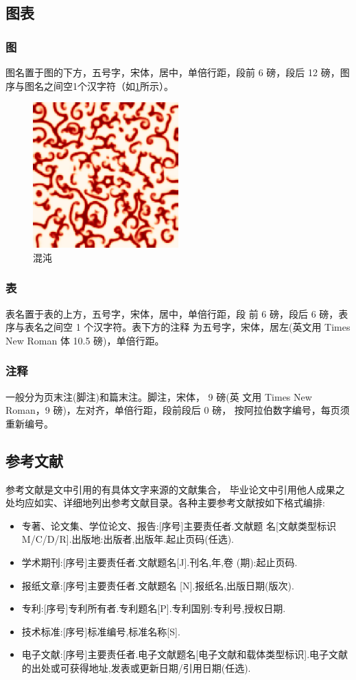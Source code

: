\documentclass{LZU}
\begin{document}
\subsection{图表}
\subsubsection{图}
\label{ssub:figure}
图名置于图的下方，五号字，宋体，居中，单倍行距，段前 6 磅，段后 12 磅，图序与图名之间空1个汉字符（如\cref{fig:chaos}所示）。
\begin{figure}
    \centering
    \includegraphics[width=0.5\textwidth]{pic/chaos.png}
    \caption{混沌}
    \label{fig:chaos}
\end{figure}

\subsubsection{表}
表名置于表的上方，五号字，宋体，居中，单倍行距，段 前 6 磅，段后 6 磅，表序与表名之间空 1 个汉字符。表下方的注释 为五号字，宋体，居左(英文用 Times New Roman 体 10.5 磅)，单倍行距。
\subsubsection{注释}
一般分为页末注(脚注)和篇末注。脚注，宋体， 9 磅(英 文用 Times New Roman，9 磅)，左对齐，单倍行距，段前段后 0 磅， 按阿拉伯数字编号，每页须重新编号。
\subsection{参考文献}
参考文献是文中引用的有具体文字来源的文献集合， 毕业论文中引用他人成果之处均应如实、详细地列出参考文献目录。各种主要参考文献按如下格式编排:
\begin{itemize}
    \item 专著、论文集、学位论文、报告:[序号]主要责任者.文献题 名[文献类型标识M/C/D/R].出版地:出版者,出版年.起止页码(任选).
    \item 学术期刊:[序号]主要责任者.文献题名[J].刊名,年,卷 (期):起止页码.
    \item 报纸文章:[序号]主要责任者.文献题名 [N].报纸名,出版日期(版次).
    \item 专利:[序号]专利所有者.专利题名[P].专利国别:专利号,授权日期.
    \item 技术标准:[序号]标准编号,标准名称[S].
    \item 电子文献:[序号]主要责任者.电子文献题名[电子文献和载体类型标识].电子文献的出处或可获得地址,发表或更新日期/引用日期(任选).
\end{itemize}
\end{document}
